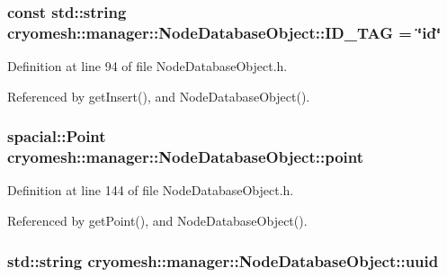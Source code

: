 \hypertarget{classcryomesh_1_1manager_1_1NodeDatabaseObject_ac46a43bc3578edde244684a90c0347c6}{
\subsubsection[{\-I\-D\-\_\-\-T\-A\-G}]{\setlength{\rightskip}{0pt plus 5cm}const std\-::string {\bf cryomesh\-::manager\-::\-Node\-Database\-Object\-::\-I\-D\-\_\-\-T\-A\-G} = \char`\"{}id\char`\"{}}}\label{classcryomesh_1_1manager_1_1NodeDatabaseObject_ac46a43bc3578edde244684a90c0347c6}


\-Definition at line 94 of file \-Node\-Database\-Object.\-h.



\-Referenced by get\-Insert(), and \-Node\-Database\-Object().

\hypertarget{classcryomesh_1_1manager_1_1NodeDatabaseObject_ae3f66b98b554fb2ef839e18b4d2a6e28}{
\subsubsection[{point}]{\setlength{\rightskip}{0pt plus 5cm}spacial\-::\-Point {\bf cryomesh\-::manager\-::\-Node\-Database\-Object\-::point}}}\label{classcryomesh_1_1manager_1_1NodeDatabaseObject_ae3f66b98b554fb2ef839e18b4d2a6e28}


\-Definition at line 144 of file \-Node\-Database\-Object.\-h.



\-Referenced by get\-Point(), and \-Node\-Database\-Object().

\hypertarget{classcryomesh_1_1manager_1_1NodeDatabaseObject_a26f7172c0939529683f5ffcba9bf18f7}{
\subsubsection[{uuid}]{\setlength{\rightskip}{0pt plus 5cm}std\-::string {\bf cryomesh\-::manager\-::\-Node\-Database\-Object\-::uuid}}}\label{classcryomesh_1_1manager_1_1NodeDatabaseObject_a26f7172c0939529683f5ffcba9bf18f7}


